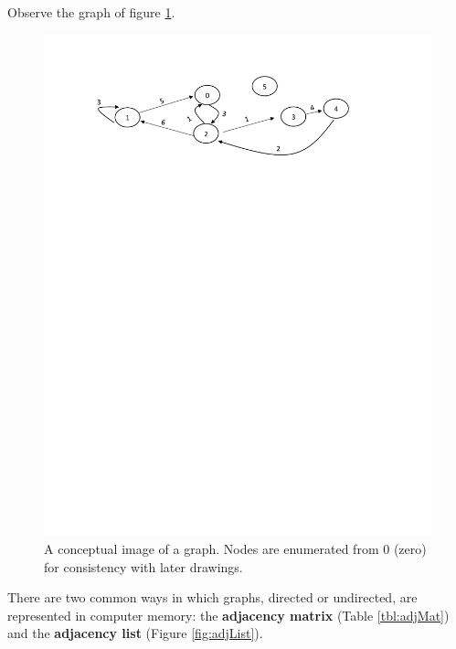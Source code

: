 \documentclass[letterpaper,12pt]{article}
\begin{document}

Observe the graph of figure \ref{fig:graph}.

\begin{figure}[H]
	\centering
	\includegraphics[scale=.9]{img/graph}
	\caption{A conceptual image of a graph. Nodes are enumerated from  $0$ (zero) \\ for consistency with later drawings.}
	\label{fig:graph}
\end{figure}

There are two common ways in which graphs, directed or undirected, are represented in computer memory: the {\bf adjacency matrix} (Table \ref{tbl:adjMat}) and the \textbf{adjacency list} (Figure \ref{fig:adjList}).  
\end{document}
